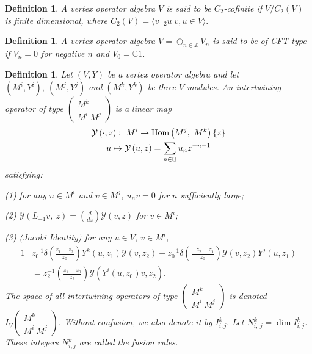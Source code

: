\documentclass{article}
\newtheorem{definition}[lemma]{Definition}
\begin{document}
	\begin{definition} A vertex operator algebra $V$ is said to be \emph{$C_{2}$-cofinite}
		if $V/C_{2}(V)$ is finite dimensional, where $C_{2}(V)=\langle v_{-2}u|v,u\in V\rangle.$
	\end{definition}
	
	\begin{definition}A vertex operator algebra $V=\oplus_{n\in\mathbb{Z}}V_{n}$
		is said to be of \emph{CFT type} if $V_{n}=0$ for negative $n$ and
		$V_{0}=\mathbb{C}1$. \end{definition}
	
	\begin{definition} Let $\left(V,Y\right)$ be a vertex operator algebra
		and let $\left(M^{i},Y^{i}\right),\ \left(M^{j},Y^{j}\right)$ and
		$\left(M^{k},Y^{k}\right)$ be three $V$-modules. An \emph{intertwining
			operator of type $\left(\begin{array}{c}
				M^{k}\\
				M^{i}\ M^{j}
			\end{array}\right)$} is a linear map
		\begin{gather*}
			\mathcal{Y}\left(\cdot,z\right):\ M^{i}\to\text{\ensuremath{\mbox{Hom}\left(M^{j},\ M^{k}\right)\left\{ z\right\} }}\\
			u\mapsto\mathcal{Y}\left(u,z\right)=\sum_{n\in\mathbb{Q}}u_{n}z^{-n-1}
		\end{gather*}
		satisfying:
		
		(1) for any $u\in M^{i}$ and $v\in M^{j}$, $u_{n}v=0$ for $n$
		sufficiently large;
		
		(2) $\mathcal{Y}(L_{-1}v,\ z)=\left(\frac{d}{dz}\right)\mathcal{Y}\left(v,z\right)$
		for $v\in M^{i}$;
		
		(3) (Jacobi Identity) for any $u\in V,\ v\in M^{i}$,
		\begin{alignat*}{1}
			& z_{0}^{-1}\delta\left(\frac{z_{1}-z_{2}}{z_{0}}\right)Y^{k}\left(u,z_{1}\right)\mathcal{Y}\left(v,z_{2}\right)-z_{0}^{-1}\delta\left(\frac{-z_{2}+z_{1}}{z_{0}}\right)\mathcal{Y}\left(v,z_{2}\right)Y^{j}\left(u,z_{1}\right)\\
			& =z_{2}^{-1}\left(\frac{z_{1}-z_{0}}{z_{2}}\right)\mathcal{Y}\left(Y^{i}\left(u,z_{0}\right)v,z_{2}\right).
		\end{alignat*}
		The space of all intertwining operators of type $\left(\begin{array}{c}
			M^{k}\\
			M^{i}\ M^{j}
		\end{array}\right)$ is denoted $I_{V}\left(\begin{array}{c}
			M^{k}\\
			M^{i}\ M^{j}
		\end{array}\right)$. Without confusion, we also denote it by $I_{i,j}^{k}.$ Let $N_{i,\ j}^{k}=\dim I_{i,j}^{k}$.
		These integers $N_{i,j}^{k}$ are called the \emph{fusion rules}.
	\end{definition}
	
\end{document}
